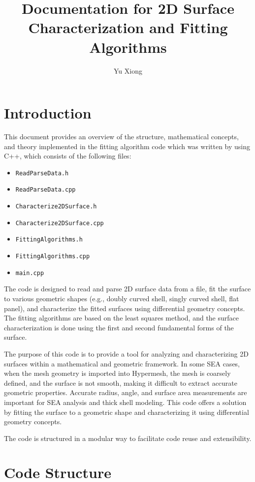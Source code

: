 \documentclass[12pt]{article}
\title{Documentation for 2D Surface Characterization and Fitting Algorithms}
\author{Yu Xiong}
\date{}
\begin{document}
\maketitle

\section{Introduction}
This document provides an overview of the structure, mathematical concepts, and theory implemented in the fitting algorithm code which was written by using C++, which consists of the following files:
\begin{itemize}
    \item \texttt{ReadParseData.h}
    \item \texttt{ReadParseData.cpp}
    \item \texttt{Characterize2DSurface.h}
    \item \texttt{Characterize2DSurface.cpp}
    \item \texttt{FittingAlgorithms.h}
    \item \texttt{FittingAlgorithms.cpp}
    \item \texttt{main.cpp}
\end{itemize}

The code is designed to read and parse 2D surface data from a file, fit the surface to various geometric shapes (e.g., doubly curved shell, singly curved shell, flat panel), and characterize the fitted surfaces using differential geometry concepts. The fitting algorithms are based on the least squares method, and the surface characterization is done using the first and second fundamental forms of the surface.

The purpose of this code is to provide a tool for analyzing and characterizing 2D surfaces within a mathematical and geometric framework. In some SEA cases, when the mesh geometry is imported into Hypermesh, the mesh is coarsely defined, and the surface is not smooth, making it difficult to extract accurate geometric properties. Accurate radius, angle, and surface area measurements are important for SEA analysis and thick shell modeling. This code offers a solution by fitting the surface to a geometric shape and characterizing it using differential geometry concepts.

The code is structured in a modular way to facilitate code reuse and extensibility.

\section{Code Structure}
\end{document}
